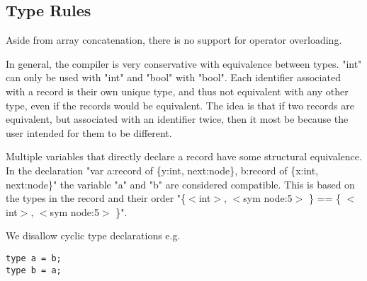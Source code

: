 \documentclass{article}
\begin{document}


\subsection{Type Rules}

Aside from array concatenation, there is no support for operator overloading.

In general, the compiler is very conservative with equivalence between types. "int" can only be used with "int" and "bool" with "bool". Each identifier associated with a record is their own unique type, and thus not equivalent with any other type, even if the records would be equivalent. The idea is that if two records are equivalent, but associated with an identifier twice, then it most be because the user intended for them to be different.

Multiple variables that directly declare a record have some structural equivalence. In the declaration "var a:record of \{y:int, next:node\}, b:record of \{x:int, next:node\}" the variable "a" and "b" are considered compatible. This is based on the types in the record and their order "\{$<$int$>$, $<$sym node:5$>$ \} == \{ $<$int$>$, $<$sym node:5$>$ \}".

We disallow cyclic type declarations e.g.
\begin{lstlisting}
type a = b;
type b = a;
\end{lstlisting}
\end{document}
